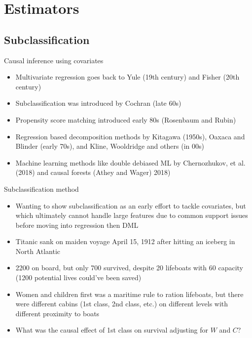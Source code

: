 \documentclass{beamer}
\begin{document}
\section{Estimators }


\subsection{Subclassification}

\begin{frame}{Causal inference using covariates}
\begin{itemize}

\item Multivariate regression goes back to Yule (19th century) and Fisher (20th century)
\item Subclassification was introduced by Cochran (late 60s)
\item Propensity score matching introduced early 80s (Rosenbaum and Rubin)
\item Regression based decomposition methods by Kitagawa (1950s), Oaxaca and Blinder (early 70s), and Kline, Wooldridge and others (in 00s)
\item Machine learning methods like double debiased ML by Chernozhukov, et al. (2018) and causal forests (Athey and Wager) 2018)
\end{itemize}

\end{frame}


\begin{frame}{Subclassification method}

\begin{itemize}

\item Wanting to show subclassification as an early effort to tackle covariates, but which ultimately cannot handle large features due to common support issues before moving into regression then DML
\item Titanic sank on maiden voyage April 15, 1912 after hitting an iceberg in North Atlantic
\item 2200 on board, but only 700 survived, despite 20 lifeboats with 60 capacity (1200 potential lives could've been saved)
\item Women and children first was a maritime rule to ration lifeboats, but there were different cabins (1st class, 2nd class, etc.) on different levels with different proximity to boats
\item What was the causal effect of 1st class on survival adjusting for $W$ and $C$?
\end{itemize}

\end{frame}
\end{document}
